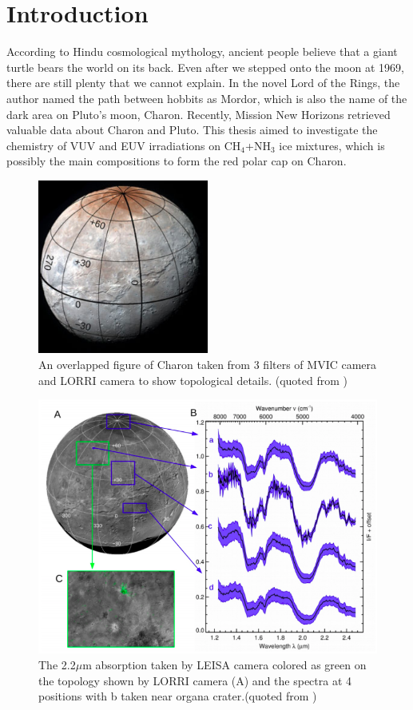 \chapter{\protect Introduction}
\label{introduction}

According to Hindu cosmological mythology, ancient people believe that a giant turtle bears the world on its back. Even after we stepped onto the moon at 1969, there are still plenty that we cannot explain. In the novel Lord of the Rings, the author named the path between hobbits as Mordor, which is also the name of the dark area on Pluto's moon, Charon. Recently, Mission New Horizons retrieved valuable data about Charon and Pluto. This thesis aimed to investigate the chemistry of VUV and EUV irradiations on CH$_4$+NH$_3$ ice mixtures, which is possibly the main compositions to form the red polar cap on Charon.

\begin{figure}
\centering
\includegraphics[width=0.5\textwidth]{figures/chapter1/charon.png}
\caption{An overlapped figure of Charon taken from 3 filters of MVIC camera and LORRI camera to show topological details. (quoted from \cite{grundy2016formation})}
\label{fig:charon}
\end{figure}

\begin{figure}
\centering
\includegraphics[width=\textwidth]{figures/chapter1/IR.png}
\caption{The 2.2$\mu$m absorption taken by LEISA camera colored as green on the topology shown by LORRI camera (A) and the spectra at 4 positions with b taken near organa crater.(quoted from \cite{grundy2016surface})}
\label{fig:Charon_IR}
\end{figure}

